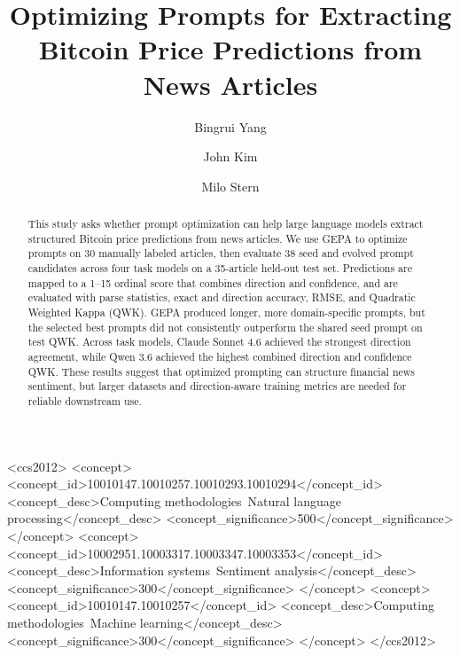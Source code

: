 \documentclass[sigconf,screen]{acmart}
\begin{document}
\title{Optimizing Prompts for Extracting Bitcoin Price Predictions from News Articles}

\author{Bingrui Yang}

\author{John Kim}

\author{Milo Stern}

\renewcommand{\shortauthors}{Yang, Kim, and Stern}

\begin{abstract}
This study asks whether prompt optimization can help large language models
extract structured Bitcoin price predictions from news articles. We use GEPA
to optimize prompts on 30 manually labeled articles, then evaluate 38 seed and
evolved prompt candidates across four task models on a 35-article held-out
test set. Predictions are mapped to a 1--15 ordinal score that combines
direction and confidence, and are evaluated with parse statistics, exact and
direction accuracy, RMSE, and Quadratic Weighted Kappa (QWK). GEPA produced
longer, more domain-specific prompts, but the selected best prompts did not
consistently outperform the shared seed prompt on test QWK. Across task
models, Claude Sonnet 4.6 achieved the strongest direction agreement, while
Qwen 3.6 achieved the highest combined direction and confidence QWK. These
results suggest that optimized prompting can structure financial news
sentiment, but larger datasets and direction-aware training metrics are needed
for reliable downstream use.
\end{abstract}

\begin{CCSXML}
<ccs2012>
   <concept>
       <concept_id>10010147.10010257.10010293.10010294</concept_id>
       <concept_desc>Computing methodologies~Natural language processing</concept_desc>
       <concept_significance>500</concept_significance>
       </concept>
   <concept>
       <concept_id>10002951.10003317.10003347.10003353</concept_id>
       <concept_desc>Information systems~Sentiment analysis</concept_desc>
       <concept_significance>300</concept_significance>
       </concept>
   <concept>
       <concept_id>10010147.10010257</concept_id>
       <concept_desc>Computing methodologies~Machine learning</concept_desc>
       <concept_significance>300</concept_significance>
       </concept>
</ccs2012>
\end{CCSXML}
\end{document}
